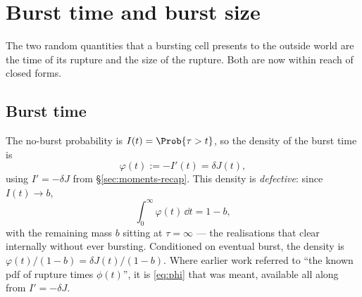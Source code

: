 \section{Burst time and burst size}
\label{sec:burst-time-size}

The two random quantities that a bursting cell presents to the outside world
are the time of its rupture and the size of the rupture. Both are now within
reach of closed forms.

\subsection{Burst time}
\label{sec:burst-time}

The no-burst probability is $I(t)=\Prob{\tau>t}$, so the density of the
burst time is
\begin{equation}
\varphi(t):=-I'(t)=\delta J(t),
\label{eq:phi}
\end{equation}
using $I'=-\delta J$ from \S\ref{sec:moments-recap}. This density is
\emph{defective}: since $I(t)\to b$,
\begin{equation}
\int_0^\infty\varphi(t)\,\dd t=1-b,
\end{equation}
with the remaining mass $b$ sitting at $\tau=\infty$ --- the realisations
that clear internally without ever bursting. Conditioned on eventual burst,
the density is $\varphi(t)/(1-b)=\delta J(t)/(1-b)$. Where earlier work
referred to ``the known pdf of rupture times $\phi(t)$'', it is
\eqref{eq:phi} that was meant, available all along from $I'=-\delta J$.


